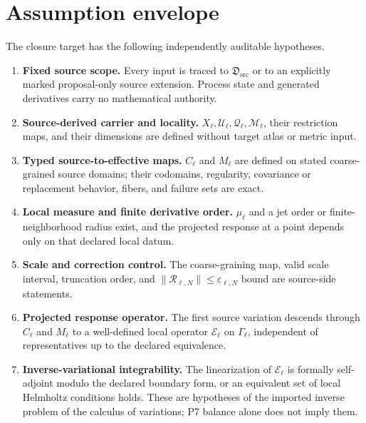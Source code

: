 \documentclass[11pt]{article}
\newcommand{\Dsrc}{\mathfrak D_{\mathrm{src}}}
\newcommand{\Qeff}{\mathcal Q_{\ell}}
\newcommand{\Meff}{\mathcal M_{\ell}}
\newcommand{\Conf}{\Gamma_{\ell}}
\newcommand{\Eop}{\mathcal E_{\ell}}
\newcommand{\Rem}{\mathcal R_{\ell,N}}
\begin{document}
\section{Assumption envelope}

The closure target has the following independently auditable hypotheses.

\begin{enumerate}
\item[\(\mathbf{A0}\)] \textbf{Fixed source scope.}
Every input is traced to \(\Dsrc\) or to an explicitly marked
proposal-only source extension.  Process state and generated derivatives
carry no mathematical authority.

\item[\(\mathbf{A1}\)] \textbf{Source-derived carrier and locality.}
\(X_\ell,\mathcal U_\ell,\Qeff,\Meff\), their restriction maps, and their
dimensions are defined without target atlas or metric input.

\item[\(\mathbf{A2}\)] \textbf{Typed source-to-effective maps.}
\(C_\ell\) and \(M_\ell\) are defined on stated coarse-grained source domains;
their codomains, regularity, covariance or replacement behavior, fibers, and
failure sets are exact.

\item[\(\mathbf{A3}\)] \textbf{Local measure and finite derivative order.}
\(\mu_\ell\) and a jet order or finite-neighborhood radius exist, and the
projected response at a point depends only on that declared local datum.

\item[\(\mathbf{A4}\)] \textbf{Scale and correction control.}
The coarse-graining map, valid scale interval, truncation order, and
\(\|\Rem\|\leq\varepsilon_{\ell,N}\) bound are source-side statements.

\item[\(\mathbf{A5}\)] \textbf{Projected response operator.}
The first source variation descends through \(C_\ell\) and \(M_\ell\) to a
well-defined local operator \(\Eop\) on \(\Conf\), independent of
representatives up to the declared equivalence.

\item[\(\mathbf{A6}\)] \textbf{Inverse-variational integrability.}
The linearization of \(\Eop\) is formally self-adjoint modulo the declared
boundary form, or an equivalent set of local Helmholtz conditions holds.
These are hypotheses of the imported inverse problem of the calculus of
variations; P7 balance alone does not imply them.


\end{enumerate}
\end{document}
